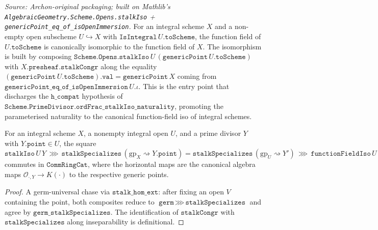 \begin{definition}
  \label{def:functionFieldIso}
  \textit{Source: Archon-original packaging; built on Mathlib's
  \texttt{AlgebraicGeometry.Scheme.Opens.stalkIso} +
  \texttt{genericPoint\_eq\_of\_isOpenImmersion}.}
  For an integral scheme \(X\) and a non-empty open subscheme
  \(U \hookrightarrow X\) with \(\texttt{IsIntegral}\,U.\texttt{toScheme}\),
  the function field of \(U.\texttt{toScheme}\) is canonically isomorphic
  to the function field of \(X\). The isomorphism is built by composing
  \(\texttt{Scheme.Opens.stalkIso}\,U\,(\texttt{genericPoint}\,U.\texttt{toScheme})\)
  with \(X.\texttt{presheaf.stalkCongr}\) along the equality
  \((\texttt{genericPoint}\,U.\texttt{toScheme}).\texttt{val}
   = \texttt{genericPoint}\,X\)
  coming from \(\texttt{genericPoint\_eq\_of\_isOpenImmersion}\,U.\iota\).
  This is the entry point that discharges the \(\texttt{h\_compat}\)
  hypothesis of
  \(\texttt{Scheme.PrimeDivisor.ordFrac\_stalkIso\_naturality}\),
  promoting the parameterised naturality to the canonical function-field
  iso of integral schemes.
\end{definition}


\begin{lemma}
  \label{lem:functionFieldIso_compat}
  For an integral scheme \(X\), a nonempty integral open \(U\), and a
  prime divisor \(Y\) with \(Y.\texttt{point} \in U\), the square
  \(\texttt{stalkIso}\,U\,Y \,\ggg\, \texttt{stalkSpecializes}\,
   (\text{gp}_X \rightsquigarrow Y.\texttt{point})
   = \texttt{stalkSpecializes}\,(\text{gp}_U \rightsquigarrow Y')
     \,\ggg\, \texttt{functionFieldIso}\,U\)
  commutes in \(\texttt{CommRingCat}\), where the horizontal maps are
  the canonical algebra maps \(\mathcal O_{\cdot, Y} \to K(\cdot)\) to
  the respective generic points.
\end{lemma}
\begin{proof}
  A germ-universal chase via \(\texttt{stalk\_hom\_ext}\): after fixing
  an open \(V\) containing the point, both composites reduce to
  \(\texttt{germ} \,\ggg\, \texttt{stalkSpecializes}\) and agree by
  \(\texttt{germ\_stalkSpecializes}\). The identification of
  \(\texttt{stalkCongr}\) with \(\texttt{stalkSpecializes}\) along
  inseparability is definitional.
\end{proof}

